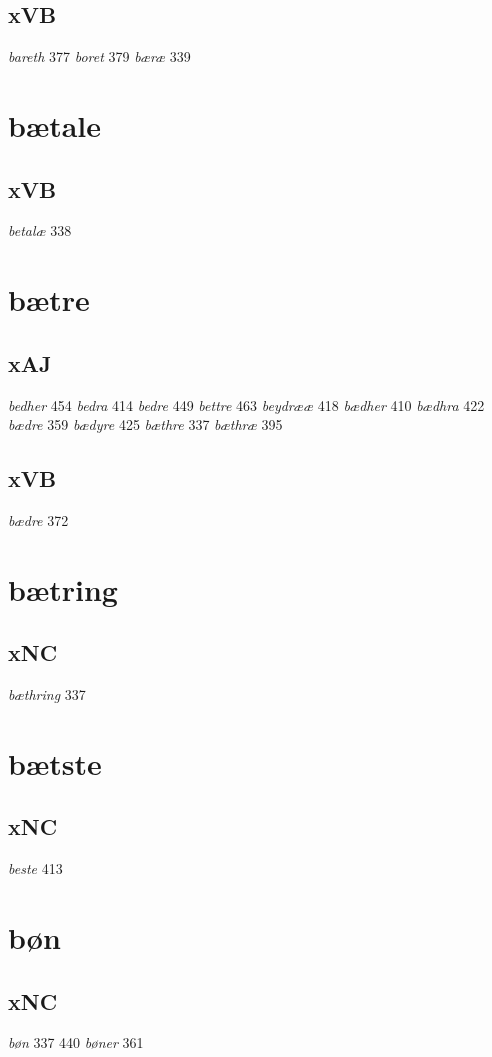 \documentclass[a4paper,twocolumn]{article}
\begin{document}
\subsection{xVB}
\label{sec:org58abfe9}
\emph{bareth} 377 \emph{boret} 379 \emph{bæræ} 339 
\section{bætale}
\label{sec:orge6f992a}
\subsection{xVB}
\label{sec:orgb171251}
\emph{betalæ} 338 
\section{bætre}
\label{sec:orgad46def}
\subsection{xAJ}
\label{sec:org1fa60ed}
\emph{bedher} 454 \emph{bedra} 414 \emph{bedre} 449 \emph{bettre} 463 \emph{beydrææ} 418 \emph{bædher} 410 \emph{bædhra} 422 \emph{bædre} 359 \emph{bædyre} 425 \emph{bæthre} 337 \emph{bæthræ} 395 
\subsection{xVB}
\label{sec:org1b8e25a}
\emph{bædre} 372 
\section{bætring}
\label{sec:org8226f15}
\subsection{xNC}
\label{sec:orgd4d2083}
\emph{bæthring} 337 
\section{bætste}
\label{sec:orgaa295fd}
\subsection{xNC}
\label{sec:org01e733c}
\emph{beste} 413 
\section{bøn}
\label{sec:org6202fc2}
\subsection{xNC}
\label{sec:org5f5e034}
\emph{bøn} 337 440 \emph{bøner} 361 
\end{document}
